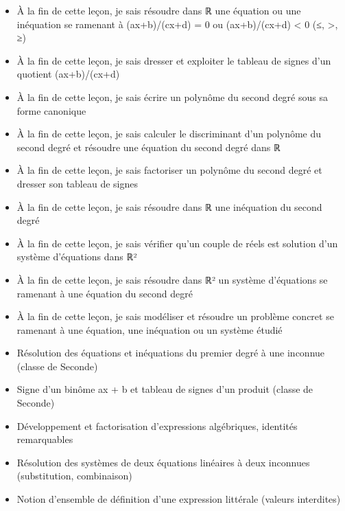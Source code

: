 \documentclass[11pt]{article}
\begin{document}
\begin{objectifs}
\begin{itemize}
\item À la fin de cette leçon, je sais résoudre dans ℝ une équation ou une inéquation se ramenant à (ax+b)/(cx+d) = 0 ou (ax+b)/(cx+d) < 0 (≤, >, ≥)
\item À la fin de cette leçon, je sais dresser et exploiter le tableau de signes d'un quotient (ax+b)/(cx+d)
\item À la fin de cette leçon, je sais écrire un polynôme du second degré sous sa forme canonique
\item À la fin de cette leçon, je sais calculer le discriminant d'un polynôme du second degré et résoudre une équation du second degré dans ℝ
\item À la fin de cette leçon, je sais factoriser un polynôme du second degré et dresser son tableau de signes
\item À la fin de cette leçon, je sais résoudre dans ℝ une inéquation du second degré
\item À la fin de cette leçon, je sais vérifier qu'un couple de réels est solution d'un système d'équations dans ℝ²
\item À la fin de cette leçon, je sais résoudre dans ℝ² un système d'équations se ramenant à une équation du second degré
\item À la fin de cette leçon, je sais modéliser et résoudre un problème concret se ramenant à une équation, une inéquation ou un système étudié
\end{itemize}
\end{objectifs}

\begin{prerequis}
\begin{itemize}
\item Résolution des équations et inéquations du premier degré à une inconnue (classe de Seconde)
\item Signe d'un binôme ax + b et tableau de signes d'un produit (classe de Seconde)
\item Développement et factorisation d'expressions algébriques, identités remarquables
\item Résolution des systèmes de deux équations linéaires à deux inconnues (substitution, combinaison)
\item Notion d'ensemble de définition d'une expression littérale (valeurs interdites)
\end{itemize}
\end{prerequis}
\end{document}
